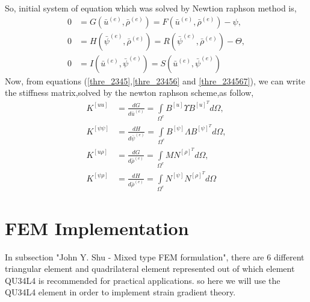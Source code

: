\documentclass[12pt]{article}
\begin{document}
So, initial system of equation which was solved by Newtion raphson method is,
\begin{equation}\label{thre_234567}
\begin{aligned}
0 &= G(\bar{u}^{(e)},\bar{\rho}^{(e)}) = F(\bar{u}^{(e)},\bar{\rho}^{(e)}) - \psi, \\
0 &= H(\bar{\psi}^{(e)},\bar{\rho}^{(e)}) = R(\bar{\psi}^{(e)},\bar{\rho}^{(e)}) - \Theta, \\
0 &= I(\bar{u}^{(e)},\bar{\psi}^{(e)}) = S(\bar{u}^{(e)},\bar{\psi}^{(e)}) 
\end{aligned}
\end{equation}
Now, from equations (\ref{thre_2345},\ref{thre_23456} and \ref{thre_234567}), we can write the stiffness matrix,solved by the newton raphson scheme,as follow,
\begin{equation}\label{thre_2345678}
\begin{aligned}
K^{[uu]}  &= \frac{dG}{d\bar{u}^{(e)}} = \int\limits_{\Omega^{e}}\! B^{[u]}\Upsilon B^{[u]^{T}} d\Omega, \\
K^{[\psi\psi]}  &= \frac{dH}{d\bar{\psi}^{(e)}} =\int\limits_{\Omega^{e}}\! B^{[\psi]} \varLambda B^{[\psi]^{T}} d\Omega, \\
K^{[u\rho]}  &= \frac{dG}{d\bar{\rho}^{(e)}}  =\int\limits_{\Omega^{e}}\! M N^{[\rho]^{T}} d\Omega, \\
K^{[\psi\rho]}  &= \frac{dH}{d\bar{\rho}^{(e)}} =\int\limits_{\Omega^{e}}\! N^{[\psi]} N^{[\rho]^{T}} d\Omega
\end{aligned}
\end{equation}
\newpage
\section{FEM Implementation}
In subsection "John Y. Shu - Mixed type FEM formulation", there are 6 different triangular element and quadrilateral element represented out of which element QU34L4 is recommended for practical applications. so here we will use the QU34L4 element in order to implement strain gradient theory.
\\
\end{document}
